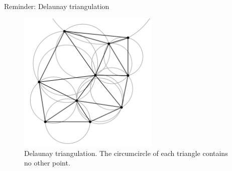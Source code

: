 \documentclass[10pt]{beamer}
\begin{document}
\begin{frame}{Reminder: Delaunay triangulation}
  \begin{figure}[H]
    \centering
    \includegraphics[width=0.6\textwidth]{images/Delaunay_circumcircles_vectorial.svg.png}
    \caption{Delaunay triangulation.
    The circumcircle of each triangle contains no other point.}
\end{figure}
\end{frame}
\end{document}
